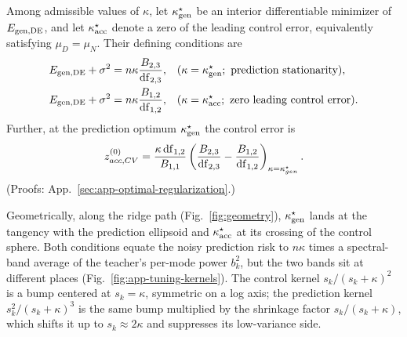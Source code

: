 \begin{prop}\label{prop:pixel-tuning}
Among admissible values of $\kappa$, let $\kappa_{\rm gen}^{\star}$ be an
interior differentiable minimizer of $E_{\rm gen,DE}$, and let
$\kappa_{\rm acc}^{\star}$ denote a zero of the leading control error,
equivalently satisfying $\mu_D=\mu_N$. Their defining conditions are
\begin{align}\small
E_{\rm gen,DE}+\sigma^2
&=n\kappa\frac{B_{2,3}}{\mathrm{df}_{2,3}},
&&(\kappa=\kappa_{\rm gen}^{\star};\ \text{prediction stationarity}),
\label{eq:gen_optim_reg_cond}\\
E_{\rm gen,DE}+\sigma^2
&=n\kappa\frac{B_{1,2}}{\mathrm{df}_{1,2}},
&&(\kappa=\kappa_{\rm acc}^{\star};\ \text{zero leading control error}).
\label{eq:acc_optim_reg_cond1}
\end{align}
Further, at the prediction optimum $\kappa_{\rm gen}^{\star}$ the control error is
\begin{equation}\small
z^{(0)}_{acc,CV}=\frac{\kappa\,\mathrm{df}_{1,2}}{B_{1,1}}
\left(\frac{B_{2,3}}{\mathrm{df}_{2,3}}-\frac{B_{1,2}}{\mathrm{df}_{1,2}}\right)_{\kappa=\kappa^\star_{gen}} .
\label{eq:pixel-zacc-cv}
\end{equation}
(Proofs: App.~\ref{sec:app-optimal-regularization}.)
\end{prop}
Geometrically, along the ridge path (Fig.~\ref{fig:geometry}), $\kappa_{\rm gen}^{\star}$ lands at the tangency with the prediction ellipsoid and $\kappa_{\rm acc}^{\star}$ at its crossing of the control sphere.
Both conditions equate the noisy prediction risk to $n\kappa$ times a spectral-band average of the teacher's per-mode power $b_k^2$, but the two bands sit at different places (Fig.~\ref{fig:app-tuning-kernels}). The control kernel $s_k/(s_k+\kappa)^2$ is a bump centered at $s_k=\kappa$, symmetric on a log axis; the prediction kernel $s_k^2/(s_k+\kappa)^3$ is the same bump multiplied by the shrinkage factor $s_k/(s_k+\kappa)$, which shifts it up to $s_k\approx2\kappa$ and suppresses its low-variance side.
